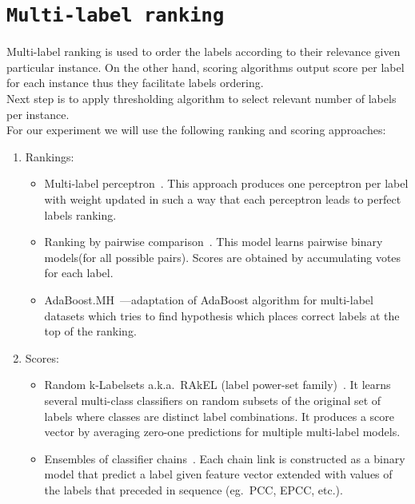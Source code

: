 \documentclass[12pt,a4paper,twocolumn]{article}
\begin{document}

\section*{\texttt{Multi-label ranking}}
Multi-label ranking is used to order the labels according to their relevance given particular instance. On the other hand, scoring algorithms output score per label for each instance thus they facilitate labels ordering.\\
Next step is to apply thresholding algorithm to select relevant number of labels per instance.\\
For our experiment we will use the following ranking and scoring approaches:

\begin{enumerate}
\item Rankings:
	\begin{itemize}
	\item Multi-label perceptron~\cite{Crammer03afamily}. This approach produces one perceptron per label with weight updated in such a way that each perceptron leads to perfect labels ranking. %
	\item Ranking by pairwise comparison~\cite{Wu:2004:PEM:1005332.1016791}. This model learns pairwise binary models(for all possible pairs). Scores are obtained by accumulating votes for each label. %
	\item AdaBoost.MH~\cite{Schapire00boostexter:a}---adaptation of AdaBoost algorithm for multi-label datasets which tries to find hypothesis which places correct labels at the top of the ranking. %
	\end{itemize}
\item Scores:
	\begin{itemize}
	\item Random k-Labelsets a.k.a.\ RAkEL (label power-set family)~\cite{Tsoumakas:2007:RKE:1421665.1421705}. It learns several multi-class classifiers on random subsets of the original set of labels where classes are distinct label combinations. It produces a score vector by averaging zero-one predictions for multiple multi-label models. %
	\item Ensembles of classifier chains~\cite{Read:2009:CCM:1617459.1617477}. Each chain link is constructed as a binary model that predict a label given feature vector extended with values of the labels that preceded in sequence (eg.\ PCC, EPCC, etc.). %
	\end{itemize}
\end{enumerate}
\end{document}
